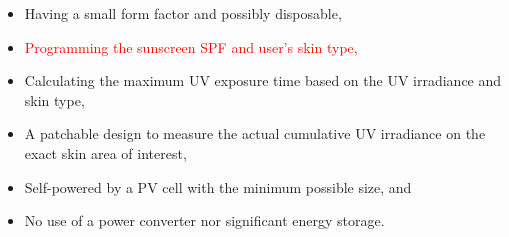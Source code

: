\documentclass[onecolumn]{IEEEconf}
\begin{document}
\begin{description}
\begin{itemize}
\item Having a small form factor and possibly disposable,
\item \textcolor{red}{Programming the sunscreen SPF and user's skin type,}
\item Calculating the maximum UV exposure time based on the UV irradiance and skin type,
\item A patchable design to measure the actual cumulative UV irradiance on the exact skin area of interest,
\item Self-powered by a PV cell with the minimum possible size, and
\item No use of a power converter nor significant energy storage.
\end{itemize}

\end{description}

\pagebreak
\end{document}
